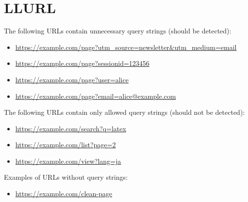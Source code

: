 \section{LLURL}

The following URLs contain unnecessary query strings (should be detected):
\begin{itemize}
    \item \url{https://example.com/page?utm_source=newsletter&utm_medium=email}
    \item \url{https://example.com/page?sessionid=123456}
    \item \url{https://example.com/page?user=alice}
    \item \url{https://example.com/page?email=alice@example.com}
\end{itemize}

The following URLs contain only allowed query strings (should not be detected):
\begin{itemize}
    \item \url{https://example.com/search?q=latex}
    \item \url{https://example.com/list?page=2}
    \item \url{https://example.com/view?lang=ja}
\end{itemize}

Examples of URLs without query strings:
\begin{itemize}
    \item \url{https://example.com/clean-page}
\end{itemize}

